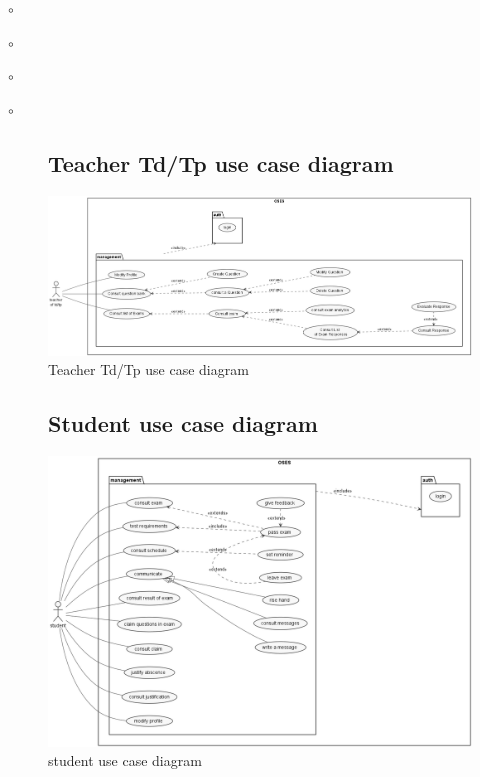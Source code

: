 \documentclass[]{uc2pfecaneva}
\begin{document}
\begin{list}{$\circ$}{}
\begin{list}{$\circ$}{}
\begin{list}{$\circ$}{}
\begin{list}{$\circ$}{}
    \begin{figure}
        \subsection{Teacher Td/Tp use case diagram}
        \centering
        \includegraphics[width=\textwidth]{images/TP_TD_Teacher}
        \caption{Teacher Td/Tp use case diagram}
    \end{figure}

    \begin{figure}
        \subsection{Student use case diagram}
        \centering
        \includegraphics[width=350pt]{images/student_UCD}
        \caption{student use case diagram}
    \end{figure}



    \begin{figure}[ht]

\end{figure}
\end{list}
\end{list}
\end{list}
\end{list}
\end{document}

